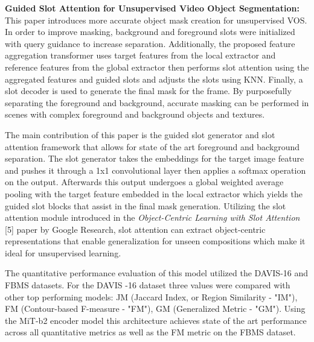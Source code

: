 \documentclass{article}
\theoremstyle{plain}
\theoremstyle{definition}
\theoremstyle{remark}
\begin{document}
\textbf{Guided Slot Attention for Unsupervised Video Object Segmentation: }
This paper introduces more accurate object mask creation for unsupervised VOS. In order to improve masking, background and foreground slots were initialized with query guidance to increase separation. Additionally, the proposed feature aggregation transformer uses target features from the local extractor and reference features from the global extractor then performs slot attention using the aggregated features and guided slots and adjusts the slots using KNN. Finally, a slot decoder is used to generate the final mask for the frame. By purposefully separating the foreground and background, accurate masking can be performed in scenes with complex foreground and background objects and textures.

\hspace{20pt} The main contribution of this paper is the guided slot generator and slot attention framework that allows for state of the art foreground and background separation.  The slot generator takes the embeddings for the target image feature and pushes it through a 1x1 convolutional layer then applies a softmax operation on the output. Afterwards this output undergoes a global weighted average pooling with the target feature embedded in the local extractor which yields the guided slot blocks that assist in the final mask generation. Utilizing the slot attention module introduced in the \textit{Object-Centric Learning with Slot Attention} [5] paper by Google Research, slot attention can extract object-centric representations that enable generalization for unseen compositions which make it ideal for unsupervised learning.

\hspace{20pt} The quantitative performance evaluation of this model utilized the DAVIS-16 and FBMS datasets. For the DAVIS -16 dataset three values were compared with other top performing models: JM (Jaccard Index, or Region Similarity - "IM"), FM (Contour-based F-measure - "FM"), GM (Generalized Metric - "GM"). Using the MiT-b2 encoder model this architecture achieves state of the art performance across all quantitative metrics as well as the FM metric on the FBMS dataset.
\end{document}
